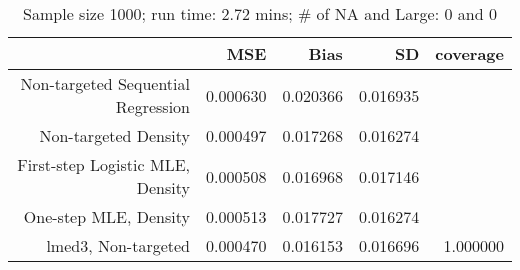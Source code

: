 \begin{table}[ht]
\centering
\caption{Sample size 1000; run time: 2.72 mins; # of NA and Large:  0 and 0} 
\begin{tabular}{rrrrr}
  \hline
 & MSE & Bias & SD & coverage \\ 
  \hline
Non-targeted Sequential Regression & 0.000630 & 0.020366 & 0.016935 &  \\ 
  Non-targeted Density & 0.000497 & 0.017268 & 0.016274 &  \\ 
  First-step Logistic MLE, Density & 0.000508 & 0.016968 & 0.017146 &  \\ 
  One-step MLE, Density & 0.000513 & 0.017727 & 0.016274 &  \\ 
  lmed3, Non-targeted & 0.000470 & 0.016153 & 0.016696 & 1.000000 \\ 
   \hline
\end{tabular}
\end{table}
